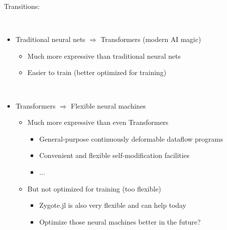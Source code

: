 \documentclass{beamer}
\newcommand{\msmagenta}[1]{{\color{mymagenta} #1}}
\begin{document}
\begin{frame}

Transitions:

\ \\

\begin{itemize}

\item Traditional neural nets $\Rightarrow$ \msmagenta{Transformers (modern AI magic)}

\begin{itemize}

\item Much more expressive than traditional neural nets

\item Easier to train (better optimized for training)

\end{itemize}


\ \\

\item Transformers $\Rightarrow$ \msmagenta{Flexible neural machines}

\begin{itemize}

\item Much more expressive than even Transformers

\begin{itemize}
\item General-purpose continuously deformable dataflow programs
\item Convenient and flexible self-modification facilities
\item ...
\end{itemize}

\item But not optimized for training (too flexible)

\begin{itemize}
\item \msmagenta{Zygote.jl is also very flexible and can help today}
\item Optimize those neural machines better in the future?
\end{itemize}

\end{itemize}

\end{itemize}

\end{frame}
\end{document}
